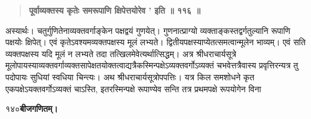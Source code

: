 \documentclass[11pt, openany]{book}
\begin{document}
\begin{sloppypar}
\begin{quote}
\hspace{1in}\textbf{पूर्वाव्यक्तस्य कृतेः समरूपाणि क्षिपेत्तयोरेव ' इति ॥ ११६ ॥}
\end{quote}

\hangindent=0.2in \hspace{0.2in}अस्यार्थः। चतुर्गुणितेनाव्यक्तवर्गाङ्केन पक्षद्वयं गुणयेत्। गुणनात्प्राग्यो व्यक्ताङ्कस्तद्वर्गतुल्यानि रूपाणि पक्षयोः क्षिपेत्। एवं कृतेऽवश्यमव्यक्तपक्षस्य मूलं लभ्यते। द्वितीयपक्षस्याप्येतत्समत्वान्मूलेन भाव्यम्। एवं सति व्यक्तपक्षस्य यदि मूलं न लभ्यते तदा तत्खिलमेवेत्यर्थात्सिद्धम्। अत्र श्रीधराचार्यसूत्रे मूलोपायस्याव्यक्तवर्गाव्यक्तसापेक्षतयोक्तत्वाद्यत्रैकस्मिन्पक्षेऽव्यक्तवर्गोऽव्यक्तं चभवेत्तत्रैवास्य प्रवृत्तिरन्यत्र तु पदोपायः सुधियां स्वधिया चिन्त्यः। अथ श्रीधराचार्यसूत्रोपपत्तिः। यत्र किल समशोधने कृत एकपक्षेऽयक्तवर्गोऽव्यक्तं चाऽस्ति, इतरस्मिन्पक्षे रूपाण्येव सन्ति तत्र प्रथमपक्षे रूपयोगेन विना
\end{sloppypar}
\thispagestyle{empty}
\newpage

\onehalfspacing
१४०\hspace{2in}\textbf{बीजगणितम्।} 

\vspace{5mm}
\end{document}
